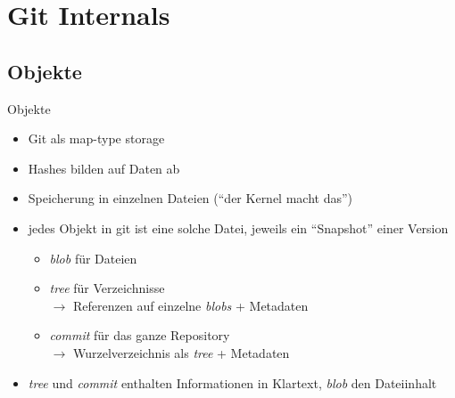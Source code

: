 \documentclass[compress,t,usenames,dvipsnames]{beamer}
\begin{document}
\section{Git Internals}
\subsection{Objekte}
\begin{frame}{Objekte}
    \begin{itemize}
        \item Git als map-type storage
        \item Hashes bilden auf Daten ab
        \item Speicherung in einzelnen Dateien (``der Kernel macht das'')
        \item jedes Objekt in git ist eine solche Datei, jeweils ein ``Snapshot''
            einer Version
            \begin{itemize}
                \item \emph{blob} für Dateien
                \item \emph{tree} für Verzeichnisse\\
                    $\rightarrow$ Referenzen auf einzelne \emph{blobs} + Metadaten
                \item \emph{commit} für das ganze Repository\\
                    $\rightarrow$ Wurzelverzeichnis als \emph{tree} + Metadaten
            \end{itemize}
        \item \emph{tree} und \emph{commit} enthalten Informationen in Klartext,  \emph{blob} den Dateiinhalt
    \end{itemize}

    \pause
    \vspace{0.5em}
\end{frame}
\end{document}
